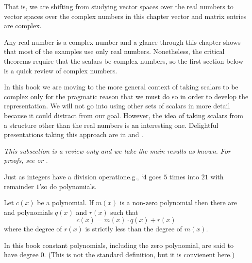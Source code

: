 That is, we are shifting from studying vector spaces over the real numbers
to vector spaces over the complex numbers\Dash
in this chapter
vector and matrix entries are complex.

Any real number is a complex number and
a glance through this chapter shows that most of the examples use
only real numbers.
Nonetheless, the critical theorems require that the scalars be complex
numbers, so
the first section below is a quick review of complex numbers.

In this book we are moving to the more general context 
of taking scalars to be complex only for the 
pragmatic reason that we must do so in order to 
develop the representation.
We will not go into using other sets of scalars in more detail because
it could distract from our goal.
However, the idea of taking scalars from a structure other than the real
numbers is an interesting one.
Delightful
presentations taking this approach are in
\cite{Halmos} and \cite{HoffmanKunze}.






\textit{
  This subsection is a review only and we take the main results as known.
  For proofs, see \cite{BirkhoffMaclane} or \cite{Ebbinghaus}.}

Just as integers have a division operation\Dash e.g., 
`\( 4 \) goes \( 5 \) times into \( 21 \) with remainder \( 1 \)'\Dash so 
do polynomials.

\begin{theorem}
\label{th:EuclidForPolys}
Let \( c(x) \) be a polynomial.
If \( m(x) \) is a non-zero polynomial then there are  and
 polynomials \( q(x) \) and \( r(x) \) such that
\begin{equation*}
  c(x)=m(x)\cdot q(x)+r(x)
\end{equation*}
where the degree of \( r(x) \) is strictly less than the degree of \( m(x) \).
\end{theorem}

\noindent In this book constant polynomials, 
including the zero polynomial, are said to have degree \( 0 \).
(This is not the standard definition, but it is convienent here.)

